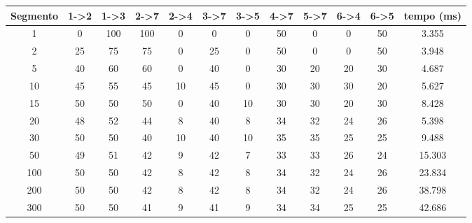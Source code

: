 \scalebox{0.65} {
\begin {tabular}{|c|c|c|c|c|c|c|c|c|c|c|c|}
\hline
Segmento & 1->2 & 1->3 & 2->7 & 2->4 & 3->7 & 3->5 & 4->7 & 5->7 & 6->4 & 6->5 & tempo (ms)\\ \hline
1 & 0 & 100 & 100 & 0 & 0 & 0 & 50 & 0 & 0 & 50 & 3.355\\ \hline
2 & 25 & 75 & 75 & 0 & 25 & 0 & 50 & 0 & 0 & 50 & 3.948\\ \hline
5 & 40 & 60 & 60 & 0 & 40 & 0 & 30 & 20 & 20 & 30 & 4.687\\ \hline
10 & 45 & 55 & 45 & 10 & 45 & 0 & 30 & 30 & 30 & 20 & 5.627\\ \hline
15 & 50 & 50 & 50 & 0 & 40 & 10 & 30 & 30 & 20 & 30 & 8.428\\ \hline
20 & 48 & 52 & 44 & 8 & 40 & 8 & 34 & 32 & 24 & 26 & 5.398\\ \hline
30 & 50 & 50 & 40 & 10 & 40 & 10 & 35 & 35 & 25 & 25 & 9.488\\ \hline
50 & 49 & 51 & 42 & 9 & 42 & 7 & 33 & 33 & 26 & 24 & 15.303\\ \hline
100 & 50 & 50 & 42 & 8 & 42 & 8 & 34 & 32 & 24 & 26 & 23.834\\ \hline
200 & 50 & 50 & 42 & 8 & 42 & 8 & 34 & 32 & 24 & 26 & 38.798\\ \hline
300 & 50 & 50 & 41 & 9 & 41 & 9 & 34 & 34 & 25 & 25 & 42.686\\ \hline

\end{tabular}
}
